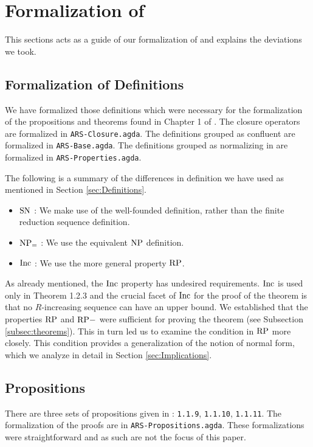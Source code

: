 \section{Formalization of \terese}
\label{sec:Formalization}
This sections acts as a guide of our formalization of \terese and explains the deviations we took.  

\subsection{Formalization of Definitions}\label{subsec:def}
We have formalized those definitions which were necessary for the formalization of the propositions and theorems found 
in Chapter 1 of \terese. 
The closure operators are formalized in \texttt{ARS-Closure.agda}. 
The definitions grouped as confluent \terese are formalized in \texttt{ARS-Base.agda}. 
The definitions grouped as normalizing in \terese are formalized in \texttt{ARS-Properties.agda}.  

The following is a summary of the differences in definition we have used as mentioned in Section \ref{sec:Definitions}. 
\begin{itemize}
    \item $\mathrm{SN}$ : We make use of the well-founded definition, rather than the finite reduction sequence definition.
    \item $\mathrm{NP_=}$ : We use the equivalent $\mathrm{NP}$ definition. 
    \item $\mathrm{Inc}$ : We use the more general property $\mathrm{RP}$.      
\end{itemize}

As already mentioned, the $\mathrm{Inc}$ property has undesired requirements. $\mathrm{Inc}$ is used only in Theorem 1.2.3 
and the crucial facet of $\mathrm{Inc}$ for the proof of the theorem is that no $R$-increasing 
sequence can have an upper bound.
We established that the properties $\mathrm{RP}$ and $\mathrm{RP-}$ were sufficient for proving the theorem (see Subsection \ref{subsec:theorems}). This in turn led us to 
examine the condition in $\mathrm{RP}$ more closely. This condition provides a generalization of the notion of normal form, 
which we analyze in detail in Section \ref{sec:Implications}. 

\subsection{Propositions}
There are three sets of propositions given in \terese: \texttt{1.1.9}, \texttt{1.1.10}, \texttt{1.1.11}. 
The formalization of the proofs are in \texttt{ARS-Propositions.agda}. These formalizations were straightforward 
and as such are not the focus of this paper. 

